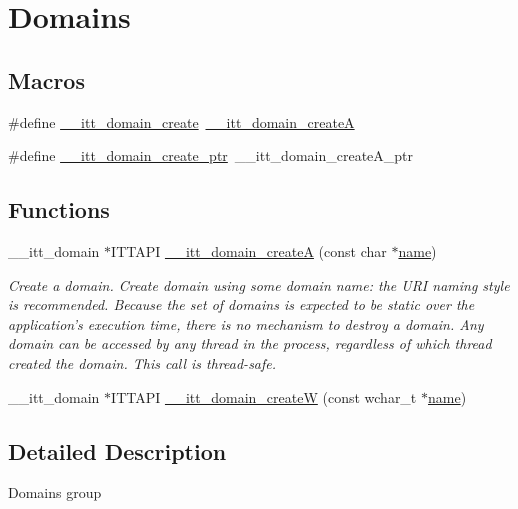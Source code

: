 \hypertarget{group__domains}{\section{Domains}
\label{group__domains}
}
\subsection*{Macros}
\begin{DoxyCompactItemize}
\item 
\#define \hyperlink{group__domains_gaaca2154ec24d785edec256a9296220a4}{\-\_\-\-\_\-itt\-\_\-domain\-\_\-create}~\hyperlink{group__domains_gae8d5e8af6425224626841526000e2ca2}{\-\_\-\-\_\-itt\-\_\-domain\-\_\-create\-A}
\item 
\#define \hyperlink{group__domains_gaf24d68da0ebd8a2773bb4a7d3875df14}{\-\_\-\-\_\-itt\-\_\-domain\-\_\-create\-\_\-ptr}~\-\_\-\-\_\-itt\-\_\-domain\-\_\-create\-A\-\_\-ptr
\end{DoxyCompactItemize}
\subsection*{Functions}
\begin{DoxyCompactItemize}
\item 
\-\_\-\-\_\-itt\-\_\-domain $\ast$I\-T\-T\-A\-P\-I \hyperlink{group__domains_gae8d5e8af6425224626841526000e2ca2}{\-\_\-\-\_\-itt\-\_\-domain\-\_\-create\-A} (const char $\ast$\hyperlink{ittnotify__static_8h_a1c34b35a4952969fef60192313bba34a}{name})
\begin{DoxyCompactList}\small\item\em Create a domain. Create domain using some domain name\-: the U\-R\-I naming style is recommended. Because the set of domains is expected to be static over the application's execution time, there is no mechanism to destroy a domain. Any domain can be accessed by any thread in the process, regardless of which thread created the domain. This call is thread-\/safe. \end{DoxyCompactList}\item 
\-\_\-\-\_\-itt\-\_\-domain $\ast$I\-T\-T\-A\-P\-I \hyperlink{group__domains_gad53a1a711a2ceaaee028f64296c89a25}{\-\_\-\-\_\-itt\-\_\-domain\-\_\-create\-W} (const wchar\-\_\-t $\ast$\hyperlink{ittnotify__static_8h_a1c34b35a4952969fef60192313bba34a}{name})
\end{DoxyCompactItemize}


\subsection{Detailed Description}
Domains group 

